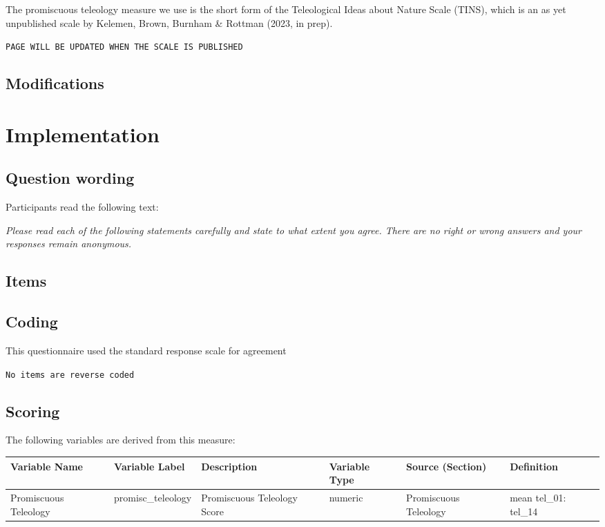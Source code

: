 \documentclass[
  letterpaper,
]{scrbook}
\begin{document}
The promiscuous teleology measure we use is the short form of the
Teleological Ideas about Nature Scale (TINS), which is an as yet
unpublished scale by Kelemen, Brown, Burnham \& Rottman (2023, in prep).

\texttt{PAGE\ WILL\ BE\ UPDATED\ WHEN\ THE\ SCALE\ IS\ PUBLISHED}

\subsection*{Modifications}\label{modifications-11}

\section{Implementation}\label{implementation-13}

\subsection*{Question wording}\label{question-wording-13}

Participants read the following text:

\emph{Please read each of the following statements carefully and state
to what extent you agree. There are no right or wrong answers and your
responses remain anonymous.}

\subsection*{Items}\label{items-13}

\subsection*{Coding}\label{coding-13}

This questionnaire used the standard response scale for agreement

\texttt{No\ items\ are\ reverse\ coded}

\subsection{Scoring}\label{scoring-13}

The following variables are derived from this measure:

\begin{tabu} to 
\toprule
Variable Name & Variable Label & Description & Variable Type & Source (Section) & Definition\\
\midrule
Promiscuous Teleology & promisc\_teleology & Promiscuous Teleology Score & numeric & Promiscuous Teleology & mean tel\_01: tel\_14\\
\bottomrule
\end{tabu}
\end{document}
